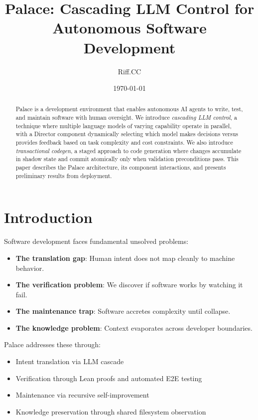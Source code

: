 \documentclass[11pt,a4paper]{article}
\title{Palace: Cascading LLM Control for Autonomous Software Development}
\author{Riff.CC}
\date{\today}
\begin{document}
\maketitle

\begin{abstract}
Palace is a development environment that enables autonomous AI agents to write,
test, and maintain software with human oversight.
We introduce \emph{cascading LLM control}, a technique where multiple language models
of varying capability operate in parallel, with a Director component dynamically
selecting which model makes decisions versus provides feedback based on task complexity
and cost constraints.
We also introduce \emph{transactional codegen}, a staged approach to code generation
where changes accumulate in shadow state and commit atomically only when validation
preconditions pass.
This paper describes the Palace architecture, its component interactions,
and presents preliminary results from deployment.
\end{abstract}

\section{Introduction}

Software development faces fundamental unsolved problems:
\begin{itemize}
    \item \textbf{The translation gap}: Human intent does not map cleanly to machine behavior.
    \item \textbf{The verification problem}: We discover if software works by watching it fail.
    \item \textbf{The maintenance trap}: Software accretes complexity until collapse.
    \item \textbf{The knowledge problem}: Context evaporates across developer boundaries.
\end{itemize}

Palace addresses these through:
\begin{itemize}
    \item Intent translation via LLM cascade
    \item Verification through Lean proofs and automated E2E testing
    \item Maintenance via recursive self-improvement
    \item Knowledge preservation through shared filesystem observation
\end{itemize}
\end{document}
